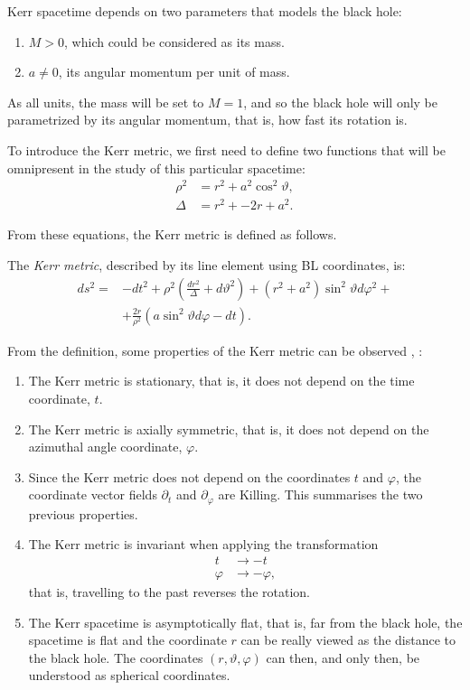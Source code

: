 Kerr spacetime depends on two parameters that models the black hole:
\begin{enumerate}
	\item $M > 0$, which could be considered as its mass.
	\item $a \neq 0$, its angular momentum per unit of mass.
\end{enumerate}

As all units, the mass will be set to $M = 1$, and so the black hole will only be parametrized by its angular momentum, that is, how fast its rotation is.

To introduce the Kerr metric, we first need to define two functions that will be omnipresent in the study of this particular spacetime:
\begin{align}
	\rho^2 &= r^2 + a^2\cos^2\vartheta, \\
	\Delta &= r^2 + -2r + a^2.
\end{align}

From these equations, the Kerr metric is defined as follows.
\begin{definition}
	The \emph{Kerr metric}, described by its line element using \ac{BL} coordinates, is:
	\begin{align}
		\label{eq:kerrmetric}
		ds^2 = &-dt^2 + \rho^2\left(\frac{dr^2}{\Delta} + d\vartheta^2\right) + \left(r^2 + a^2\right)\sin^2\vartheta d\varphi^2 + \\
		\nonumber
		&+ \frac{2r}{\rho^2}\left(a\sin^2\vartheta d\varphi - dt\right).
	\end{align}
\end{definition}

From the definition, some properties of the Kerr metric can be observed \cite[Sec. 2.1]{galindo14}, \cite[pp. 58-59]{oneill95}:
\begin{enumerate}
	\item The Kerr metric is stationary, that is, it does not depend on the time coordinate, $t$.
	\item The Kerr metric is axially symmetric, that is, it does not depend on the azimuthal angle coordinate, $\varphi$.
	\item Since the Kerr metric does not depend on the coordinates $t$ and $\varphi$, the coordinate vector fields $\partial_t$ and $\partial_\varphi$ are Killing. This summarises the two previous properties.
	\item The Kerr metric is invariant when applying the transformation
	\begin{align*}
		t &\to -t \\
		\varphi &\to -\varphi,
	\end{align*}
	that is, travelling to the past reverses the rotation.
	\item The Kerr spacetime is asymptotically flat, that is, far from the black hole, the spacetime is flat and the coordinate $r$ can be really viewed as the distance to the black hole. The coordinates $(r, \vartheta, \varphi)$ can then, and only then, be understood as spherical coordinates.
\end{enumerate}

